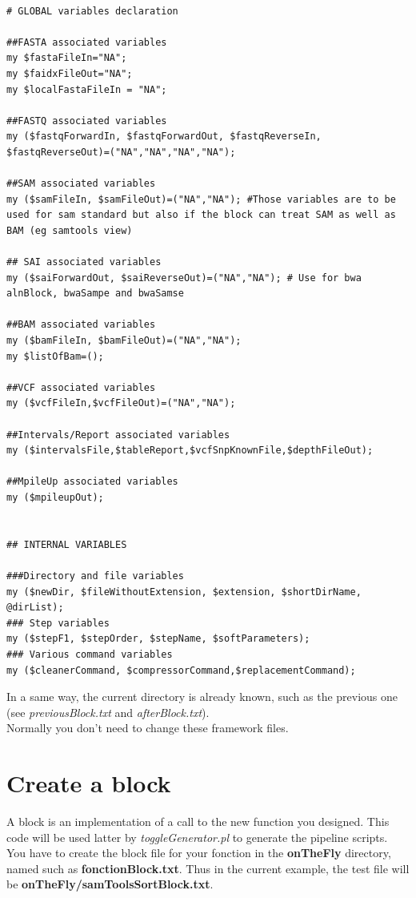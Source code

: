 \documentclass[a4paper,10pt]{report}
\begin{document}
\begin{lstlisting}

# GLOBAL variables declaration

##FASTA associated variables
my $fastaFileIn="NA";
my $faidxFileOut="NA";
my $localFastaFileIn = "NA";

##FASTQ associated variables
my ($fastqForwardIn, $fastqForwardOut, $fastqReverseIn, $fastqReverseOut)=("NA","NA","NA","NA");

##SAM associated variables
my ($samFileIn, $samFileOut)=("NA","NA"); #Those variables are to be used for sam standard but also if the block can treat SAM as well as BAM (eg samtools view)

## SAI associated variables
my ($saiForwardOut, $saiReverseOut)=("NA","NA"); # Use for bwa alnBlock, bwaSampe and bwaSamse

##BAM associated variables
my ($bamFileIn, $bamFileOut)=("NA","NA");
my $listOfBam=();

##VCF associated variables
my ($vcfFileIn,$vcfFileOut)=("NA","NA");

##Intervals/Report associated variables
my ($intervalsFile,$tableReport,$vcfSnpKnownFile,$depthFileOut);

##MpileUp associated variables
my ($mpileupOut);


## INTERNAL VARIABLES

###Directory and file variables
my ($newDir, $fileWithoutExtension, $extension, $shortDirName, @dirList);
### Step variables
my ($stepF1, $stepOrder, $stepName, $softParameters);
### Various command variables
my ($cleanerCommand, $compressorCommand,$replacementCommand);

\end{lstlisting}

In a same way, the current directory is already known, such as the previous one (see \emph{previousBlock.txt} and \emph{afterBlock.txt}). \\

Normally you don't need to change these framework files.

\section{Create a block}

A block is an implementation of a call to the new function you designed. This code will be used latter by \textit{toggleGenerator.pl} to generate the pipeline scripts. You have to create the block file for your fonction in the \textbf{onTheFly} directory, named such as \textbf{fonctionBlock.txt}. Thus in the current example, the test file will be \textbf{onTheFly/samToolsSortBlock.txt}. \\
\end{document}
